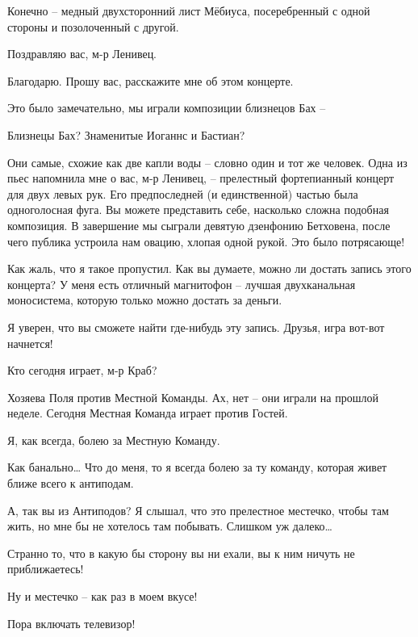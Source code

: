 \documentclass[../main.tex]{subfiles}
\begin{document}
\begin{dialogue}
 Конечно \--- медный двухсторонний лист Мёбиуса, посеребренный с одной стороны и позолоченный с другой.

 Поздравляю вас, м-р Ленивец.

 Благодарю. Прошу вас, расскажите мне об этом концерте.

 Это было замечательно, мы играли композиции близнецов Бах \---

 Близнецы Бах? Знаменитые Иоганнс и Бастиан?

 Они самые, схожие как две капли воды \--- словно один и тот же человек. Одна из пьес напомнила мне о вас, м-р Ленивец, \--- прелестный фортепианный концерт для двух левых рук. Его предпоследней (и единственной) частью была одноголосная фуга. Вы можете представить себе, насколько сложна подобная композиция. В завершение мы сыграли девятую дзенфонию Бетховена, после чего публика устроила нам овацию, хлопая одной рукой. Это было потрясающе!

 Как жаль, что я такое пропустил. Как вы думаете, можно ли достать запись этого концерта? У меня есть отличный магнитофон \--- лучшая двухканальная моносистема, которую только можно достать за деньги.

 Я уверен, что вы сможете найти где-нибудь эту запись. Друзья, игра вот-вот начнется!

 Кто сегодня играет, м-р Краб?

 Хозяева Поля против Местной Команды. Ах, нет \--- они играли на прошлой неделе. Сегодня Местная Команда играет против Гостей.

 Я, как всегда, болею за Местную Команду.

 Как банально\ldots{} Что до меня, то я всегда болею за ту команду, которая живет ближе всего к антиподам.

 А, так вы из Антиподов? Я слышал, что это прелестное местечко, чтобы там жить, но мне бы не хотелось там побывать. Слишком уж далеко\ldots{}

 Странно то, что в какую бы сторону вы ни ехали, вы к ним ничуть не приближаетесь!

 Ну и местечко \--- как раз в моем вкусе!

 Пора включать телевизор!



\end{dialogue}
\end{document}
